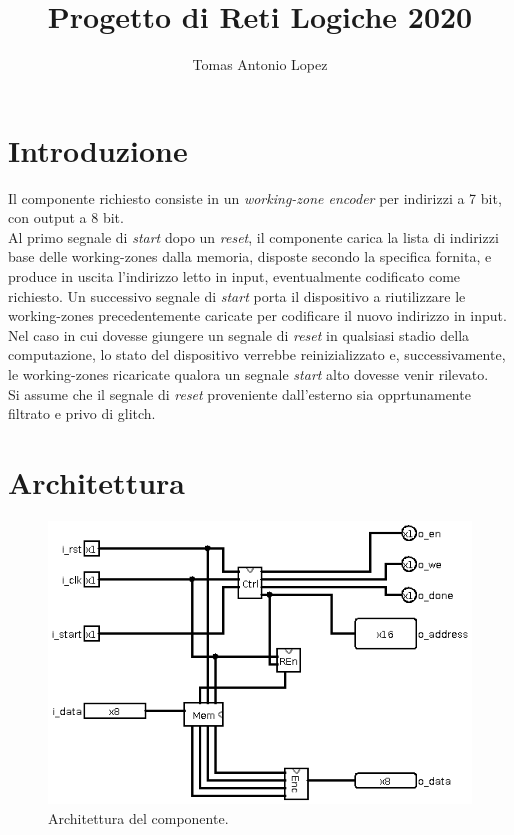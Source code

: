 \documentclass[11pt,a4paper]{article}
\title{\textbf{Progetto di Reti Logiche 2020}}
\author{Tomas Antonio Lopez}
\begin{document}
\maketitle
\tableofcontents
\listoffigures

\newpage

\section{Introduzione}
Il componente richiesto consiste in un \emph{working-zone encoder} per indirizzi a 7 bit, con output a 8 bit.\\
Al primo segnale di \emph{start} dopo un \emph{reset}, il componente carica la lista di indirizzi base delle working-zones dalla memoria, disposte
secondo la specifica fornita, e produce in uscita l'indirizzo letto in input, eventualmente codificato come richiesto. Un successivo segnale di
\emph{start} porta il dispositivo a riutilizzare le working-zones precedentemente caricate per codificare il nuovo indirizzo in input. Nel caso in cui
dovesse giungere un segnale di \emph{reset} in qualsiasi stadio della computazione, lo stato del dispositivo verrebbe reinizializzato e, successivamente,
le working-zones ricaricate qualora un segnale \emph{start} alto dovesse venir rilevato.\\
Si assume che il segnale di \emph{reset} proveniente dall'esterno sia opprtunamente filtrato e privo di glitch.

\section{Architettura}
\begin{figure}[ht]
    \includegraphics[scale=0.65]{component.png}
    \caption[Il componente]{Architettura del componente.}
\end{figure}
\end{document}
